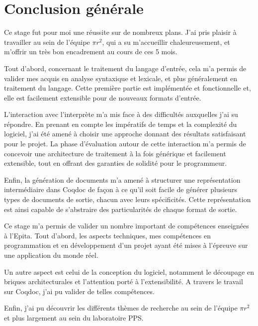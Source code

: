 \documentclass[a4paper, 11pt]{report}
\newcommand{\pir}[0]{\textbf{$\pi r^2$}\xspace}
\begin{document}
\chapter{Conclusion générale}
Ce stage fut pour moi une réussite sur de nombreux plans. J'ai pris plaisir
à travailler au sein de l'équipe \pir, qui a su m'accueillir chaleureusement, et
m'offrir un très bon encadrement au cours de ces 5 mois.

Tout d'abord, concernant le traitement du langage d'entrée, cela m'a permis
de valider mes acquis en analyse syntaxique et lexicale, et plus généralement
en traitement du langage. Cette première partie est implémentée et fonctionnelle
et, elle est facilement extensible pour de nouveaux formats d'entrée.

L'interaction avec l'interprète m'a mis face à des difficultés auxquelles j'ai
su répondre. En prenant en compte les impératifs de temps et la complexité du
logiciel, j'ai été amené à choisir une approche donnant des résultats
satisfaisant pour le projet. La phase d'évaluation autour de cette interaction
m'a permis de concevoir une architecture de traitement à la fois générique et
facilement extensible, tout en offrant des garanties de solidité pour le
programmeur.

Enfin, la génération de documents m'a amené à structurer une représentation
intermédiaire dans Coqdoc de façon à ce qu'il soit facile de générer plusieurs
types de documents de sortie, chacun avec leurs spécificités. Cette représentation
est ainsi capable de s'abstraire des particularités de chaque format de sortie.

Ce stage m'a permis de valider un nombre important de compétences enseignées
à l'Epita. Tout d'abord, les aspects techniques, mes compétences en
programmation et en développement d'un projet ayant été mises à l'épreuve sur
une application du monde réel.

Un autre aspect est celui de la conception du logiciel, notamment le découpage
en briques architecturales et l'attention porté à l'extensibilité. A travers
le travail sur Coqdoc, j'ai pu valider de telles compétences.

Enfin, j'ai pu découvrir les différents thèmes de recherche au sein de l'équipe
\pir et plus largement au sein du laboratoire PPS.


\end{document}
